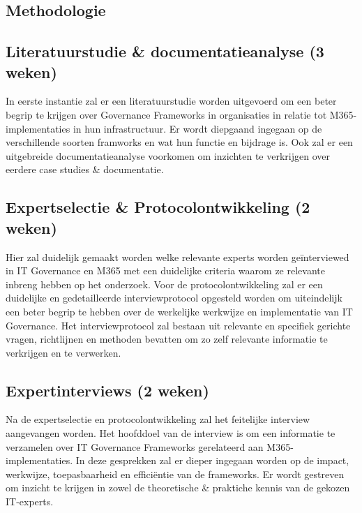 \begin{itemize}



\section{Methodologie}%
\label{sec:methodologie}

\subsection{Literatuurstudie \& documentatieanalyse (3 weken)}
In eerste instantie zal er een literatuurstudie worden uitgevoerd om een beter begrip te krijgen over Governance Frameworks in organisaties in relatie tot M365-implementaties in hun infrastructuur. Er wordt diepgaand ingegaan op de verschillende soorten framworks en wat hun functie en bijdrage is. Ook zal er een uitgebreide documentatieanalyse voorkomen om inzichten te verkrijgen over eerdere case studies \& documentatie.

\subsection{Expertselectie \& Protocolontwikkeling (2 weken)}
Hier zal duidelijk gemaakt worden welke relevante experts worden geïnterviewed in IT Governance en M365 met een duidelijke criteria waarom ze relevante inbreng hebben op het onderzoek. Voor de protocolontwikkeling zal er een duidelijke en gedetailleerde interviewprotocol opgesteld worden om uiteindelijk een beter begrip te hebben over de werkelijke werkwijze en implementatie van IT Governance.
Het interviewprotocol zal bestaan uit relevante en specifiek gerichte vragen, richtlijnen en methoden bevatten om zo zelf relevante informatie te verkrijgen en te verwerken.

\subsection{Expertinterviews (2 weken)}
Na de expertselectie en protocolontwikkeling zal het feitelijke interview aangevangen worden. Het hoofddoel van de interview is om een informatie te verzamelen over IT Governance Frameworks gerelateerd aan M365-implementaties. In deze gesprekken zal er dieper ingegaan worden op de impact, werkwijze, toepasbaarheid en efficiëntie van de frameworks.
Er wordt gestreven om inzicht te krijgen in zowel de theoretische \& praktiche kennis van de gekozen IT-experts.


\end{itemize}
